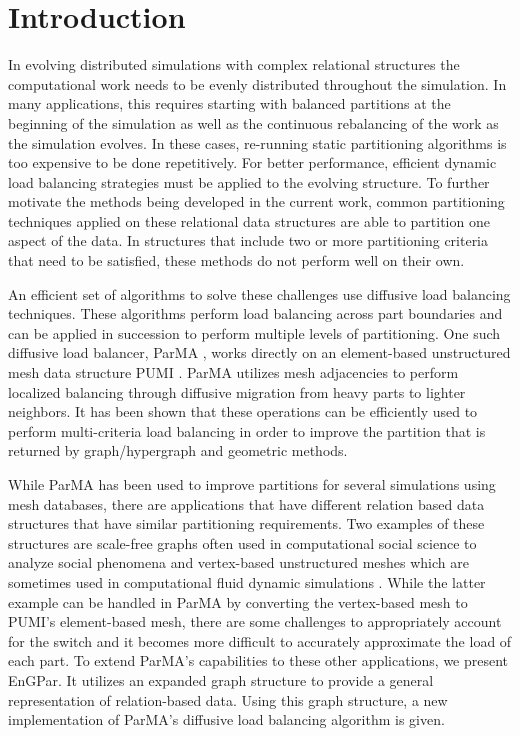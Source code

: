 \section{Introduction}


In evolving distributed simulations with complex
relational structures the computational work needs to
be evenly distributed throughout the simulation. 
In many applications, this requires starting with balanced
partitions at the beginning of the simulation
as well as the continuous rebalancing of the work as the
simulation evolves. In these cases, re-running static partitioning
algorithms is too expensive to be done repetitively.
For better performance, efficient dynamic load
balancing strategies must be applied to the evolving
structure. To further motivate the methods being developed
in the current work, common
partitioning techniques applied on these relational data
structures are able to partition one aspect of the data.
In structures that include two or more partitioning
criteria that need to be satisfied, these methods do not
perform well on their own.

An efficient set of algorithms to solve these challenges
use diffusive load balancing techniques.
These algorithms perform load balancing across part
boundaries and can be applied in succession to perform
multiple levels of partitioning.
One such diffusive load balancer, ParMA \cite{SmithParma2015}, works directly
on an element-based unstructured mesh data structure PUMI \cite{ibanez2016pumi}.
ParMA utilizes mesh adjacencies to perform localized
balancing through diffusive migration from
heavy parts to lighter neighbors.
It has been shown that these operations
can be efficiently used to perform
multi-criteria load balancing in order to
improve the partition that is returned by
graph/hypergraph and geometric methods.

While ParMA has been used to improve partitions for
several simulations using mesh databases, there are applications that have
different relation based data structures that have similar
partitioning requirements. Two examples of these
structures are scale-free graphs often used in
computational social science to analyze social
phenomena \cite{pienta2013parallel,gonzalez2012powergraph}
and vertex-based unstructured meshes which are sometimes
used in computational fluid dynamic simulations
\cite{anderson1999achieving}. While the latter example can
be handled in ParMA by converting the vertex-based mesh to
PUMI's element-based mesh, there are some challenges to
appropriately account for the switch and it becomes more
difficult to accurately approximate the load of each part.
To extend ParMA's capabilities to these other applications,
we present EnGPar. It utilizes an expanded graph structure
to provide a general representation
of relation-based data. Using this graph structure, a new
implementation of ParMA's diffusive load balancing algorithm is given.


